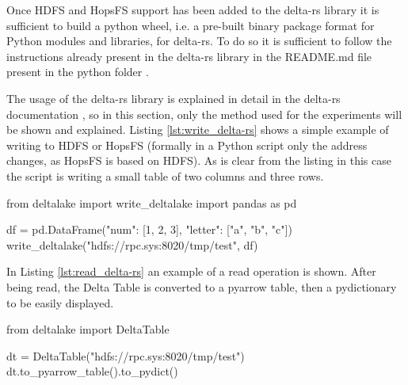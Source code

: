Once \gls{HDFS} and \gls{HopsFS} support has been added to the delta-rs library it is sufficient to build a python wheel, i.e. a pre-built binary package format for Python modules and libraries, for delta-rs. To do so it is sufficient to follow the instructions already present in the delta-rs library in the README.md file present in the python folder \cite{DeltarsPythonMain}.

The usage of the delta-rs library is explained in detail in the delta-rs documentation \cite{DeltaioDeltars2024}, so in this section, only the method used for the experiments will be shown and explained. Listing \ref{lst:write_delta-rs} shows a simple example of writing to \gls{HDFS} or \gls{HopsFS} (formally in a Python script only the address changes, as \gls{HopsFS} is based on \gls{HDFS}). As is clear from the listing in this case the script is writing a small table of two columns and three rows.

\begin{python}[caption={Writing a data frame on a Delta Table with delta-rs on \gls{HDFS} or \gls{HopsFS}}, label={lst:write_delta-rs}]
from deltalake import write_deltalake
import pandas as pd

df = pd.DataFrame({"num": [1, 2, 3], 
                   "letter": ["a", "b", "c"]})
write_deltalake("hdfs://rpc.sys:8020/tmp/test", df)
\end{python}
\medskip

In Listing \ref{lst:read_delta-rs} an example of a read operation is shown. After being read, the Delta Table is converted to a pyarrow table, then a pydictionary to be easily displayed.

\begin{python}[caption={Reading a data frame on a Delta Table with delta-rs on \gls{HDFS} or \gls{HopsFS}}, label={lst:read_delta-rs}]
from deltalake import DeltaTable

dt = DeltaTable("hdfs://rpc.sys:8020/tmp/test")
dt.to_pyarrow_table().to_pydict()
\end{python}